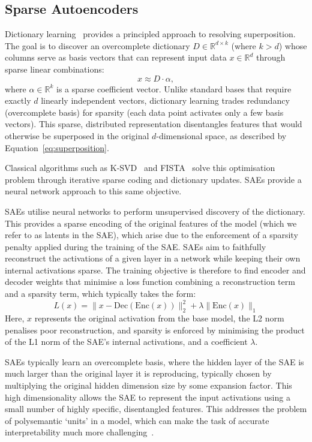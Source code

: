 \subsection{Sparse Autoencoders}\label{subsec:SAEs}

Dictionary learning~\citep{olshausen_1996_emergence} provides a principled approach to resolving superposition. The goal is to discover an overcomplete dictionary $D \in \mathbb{R}^{d \times k}$ (where $k > d$) whose columns serve as basis vectors that can represent input data $x \in \mathbb{R}^d$ through sparse linear combinations:
\[ x \approx D \cdot \alpha, \]
where $\alpha \in \mathbb{R}^k$ is a sparse coefficient vector. Unlike standard bases that require exactly $d$ linearly independent vectors, dictionary learning trades redundancy (overcomplete basis) for sparsity (each data point activates only a few basis vectors). This sparse, distributed representation disentangles features that would otherwise be superposed in the original $d$-dimensional space, as described by Equation~\ref{eq:superposition}.

Classical algorithms such as K-SVD~\citep{aharon_2006_ksvd} and FISTA~\citep{doi:10.1137/080716542} solve this optimisation problem through iterative sparse coding and dictionary updates. SAEs provide a neural network approach to this same objective.

SAEs utilise neural networks to perform unsupervised discovery of the dictionary. This provides a sparse encoding of the original features of the model (which we refer to as latents in the SAE), which arise due to the enforcement of a sparsity penalty applied during the training of the SAE. SAEs aim to faithfully reconstruct the activations of a given layer in a network while keeping their own internal activations sparse. The training objective is therefore to find encoder and decoder weights that minimise a loss function combining a reconstruction term and a sparsity term, which typically takes the form:
\[L(x) = \|x - \text{Dec}(\text{Enc}(x))\|_2^2 + \lambda \|\text{Enc}(x)\|_1\]
Here, \(x\) represents the original activation from the base model, the L2 norm penalises poor reconstruction, and sparsity is enforced by minimising the product of the L1 norm of the SAE's internal activations, and a coefficient \(\lambda\)\citep{bricken2023monosemanticity}.

SAEs typically learn an overcomplete basis, where the hidden layer of the SAE is much larger than the original layer it is reproducing, typically chosen by multiplying the original hidden dimension size by some expansion factor. This high dimensionality allows the SAE to represent the input activations using a small number of highly specific, disentangled features. This addresses the problem of polysemantic `units' in a model, which can make the task of accurate interpretability much more challenging~\citep{elhage2022superposition}.

